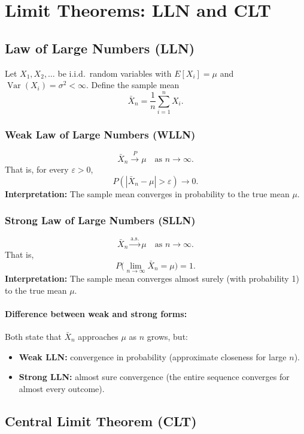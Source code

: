 \documentclass[12pt]{article}
\begin{document}
\section{Limit Theorems: LLN and CLT}

\subsection{Law of Large Numbers (LLN)}

Let $X_1, X_2, \dots$ be i.i.d.\ random variables with $E[X_i]=\mu$ and $\operatorname{Var}(X_i)=\sigma^2<\infty$.
Define the sample mean
\[
\bar{X}_n = \frac{1}{n}\sum_{i=1}^{n} X_i.
\]

\subsubsection*{Weak Law of Large Numbers (WLLN)}
\[
\bar{X}_n \xrightarrow{P} \mu \quad\text{as } n\to\infty.
\]
That is, for every $\varepsilon>0$,
\[
P(|\bar{X}_n - \mu| > \varepsilon) \longrightarrow 0.
\]
\textbf{Interpretation:} The sample mean converges in probability to the true mean $\mu$.

\subsubsection*{Strong Law of Large Numbers (SLLN)}
\[
\bar{X}_n \xrightarrow{\text{a.s.}} \mu \quad\text{as } n\to\infty.
\]
That is,
\[
P\!\Big(\lim_{n\to\infty}\bar{X}_n = \mu\Big)=1.
\]
\textbf{Interpretation:} The sample mean converges almost surely (with probability 1) to the true mean $\mu$.

\paragraph{Difference between weak and strong forms:}
Both state that $\bar{X}_n$ approaches $\mu$ as $n$ grows, but:
\begin{itemize}[leftmargin=1.2em]
  \item \textbf{Weak LLN:} convergence in probability (approximate closeness for large $n$).
  \item \textbf{Strong LLN:} almost sure convergence (the entire sequence converges for almost every outcome).
\end{itemize}

\subsection{Central Limit Theorem (CLT)}
\end{document}

